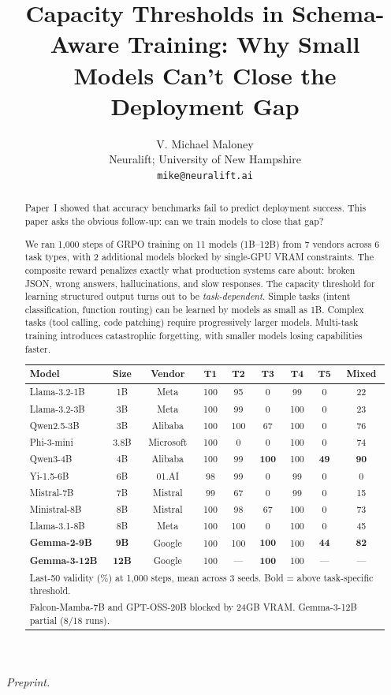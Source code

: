 \documentclass[11pt]{article}
\title{Capacity Thresholds in Schema-Aware Training: Why Small Models Can't Close the Deployment Gap}
\author{
V. Michael Maloney \\
Neuralift; University of New Hampshire \\
\texttt{mike@neuralift.ai}
}
\date{}
\begin{document}
\maketitle
\begin{center}
\textit{Preprint.}
\end{center}

\begin{abstract}
Paper~I showed that accuracy benchmarks fail to predict deployment success.  This paper asks the obvious follow-up: can we train models to close that gap?

We ran 1{,}000 steps of GRPO training on 11 models (1B--12B) from 7 vendors across 6 task types, with 2 additional models blocked by single-GPU VRAM constraints.  The composite reward penalizes exactly what production systems care about: broken JSON, wrong answers, hallucinations, and slow responses.  The capacity threshold for learning structured output turns out to be \emph{task-dependent}.  Simple tasks (intent classification, function routing) can be learned by models as small as 1B. Complex tasks (tool calling, code patching) require progressively larger models.  Multi-task training introduces catastrophic forgetting, with smaller models losing capabilities faster.

\begin{center}
\small
\begin{tabular}{lcc cccccc}
\toprule
\textbf{Model} & \textbf{Size} & \textbf{Vendor} & \textbf{T1} & \textbf{T2} & \textbf{T3} & \textbf{T4} & \textbf{T5} & \textbf{Mixed} \\
\midrule
Llama-3.2-1B & 1B & Meta & 100 & 95 & 0 & 99 & 0 & 22 \\
Llama-3.2-3B & 3B & Meta & 100 & 99 & 0 & 100 & 0 & 23 \\
Qwen2.5-3B & 3B & Alibaba & 100 & 100 & 67 & 100 & 0 & 76 \\
Phi-3-mini & 3.8B & Microsoft & 100 & 0 & 0 & 100 & 0 & 74 \\
Qwen3-4B & 4B & Alibaba & 100 & 99 & \textbf{100} & 100 & \textbf{49} & \textbf{90} \\
Yi-1.5-6B & 6B & 01.AI & 98 & 99 & 0 & 99 & 0 & 0 \\
Mistral-7B & 7B & Mistral & 99 & 67 & 0 & 99 & 0 & 15 \\
Ministral-8B & 8B & Mistral & 100 & 98 & 67 & 100 & 0 & 73 \\
Llama-3.1-8B & 8B & Meta & 100 & 100 & 0 & 100 & 0 & 45 \\
\textbf{Gemma-2-9B} & \textbf{9B} & Google & 100 & 100 & \textbf{100} & 100 & \textbf{44} & \textbf{82} \\
\textbf{Gemma-3-12B} & \textbf{12B} & Google & 100 & --- & \textbf{100} & 100 & --- & --- \\
\bottomrule
\multicolumn{9}{l}{\footnotesize Last-50 validity (\%) at 1{,}000 steps, mean across 3 seeds.  Bold = above task-specific threshold.}\\
\multicolumn{9}{l}{\footnotesize Falcon-Mamba-7B and GPT-OSS-20B blocked by 24GB VRAM.  Gemma-3-12B partial (8/18 runs).}
\end{tabular}
\end{center}


\end{abstract}
\end{document}
